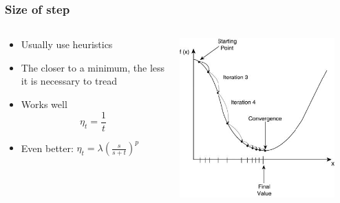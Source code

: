 \documentclass[default]{beamer}
\begin{document}
	\begin{frame}	
		\frametitle{Size of step}
		
		\begin{columns}
			\begin{column}{0.5\textwidth}
				\begin{itemize}
					\item Usually use heuristics
					\item The closer to a minimum, the less it is necessary to tread
					\item Works well
					\[
						\eta_t=\frac{1}{t}
					\]
					\item Even better: $\eta_t=\lambda\left( \frac{s}{s+t} \right)^p$
				\end{itemize}
			\end{column}
			\begin{column}{0.5\textwidth}
				\centering
				\includegraphics[width=0.9\textwidth]{linear_33.jpg}
			\end{column}
		\end{columns}
		
	\end{frame}
\end{document}
